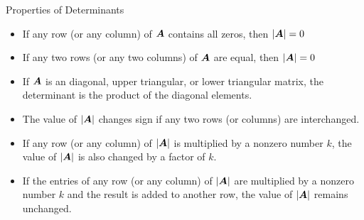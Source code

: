 \documentclass{beamer}
\begin{document}
\begin{frame}
\begin{block}{Properties of Determinants}
\begin{itemize}[<+- | alert@+>]
\item If any row (or any column) of $\boldsymbol{A}$ contains all zeros, then ${\left\lvert \boldsymbol{A}\right\rvert}=0$
\item If any two rows (or any two columns) of $\boldsymbol{A}$ are equal, then ${\left\lvert \boldsymbol{A}\right\rvert}=0$
\item If $\boldsymbol{A}$ is an diagonal, upper triangular, or lower triangular matrix, the determinant is the product of the diagonal elements.
\item The value of ${\left\lvert \boldsymbol{A}\right\rvert}$ changes sign if any two rows (or columns) are interchanged.
\item If any row (or any column) of ${\left\lvert \boldsymbol{A}\right\rvert}$ is multiplied by a nonzero number $k$, the value of ${\left\lvert \boldsymbol{A}\right\rvert}$ is also changed by a factor of $k$.
\item If the entries of any row (or any column) of ${\left\lvert \boldsymbol{A}\right\rvert}$ are multiplied by a nonzero number $k$ and the result is added to another row, the value of ${\left\lvert \boldsymbol{A}\right\rvert}$ remains unchanged.
\end{itemize}
\end{block}
\end{frame}
\end{document}

